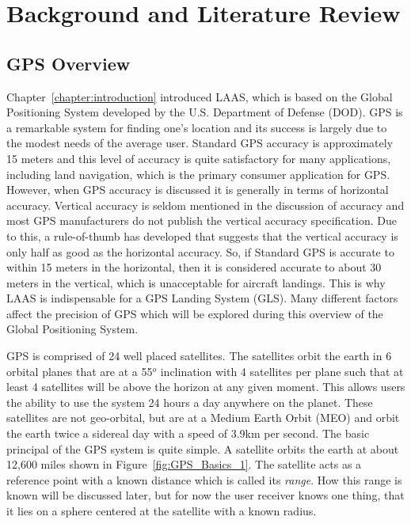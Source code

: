 \chapter{Background and Literature Review}
\label{ch:background}
\section{GPS Overview}

Chapter~\ref{chapter:introduction} introduced LAAS, which is based on the Global Positioning System developed by the U.S. Department of Defense (DOD).  GPS is a remarkable system for finding one's location and its success is largely due to the modest needs of the average user. Standard GPS accuracy is approximately 15 meters\citep[]{GPS_FOR_DUMMIES} and this level of accuracy is quite satisfactory for many applications, including land navigation, which is the primary consumer application for GPS. However, when GPS accuracy is discussed it is generally in terms of horizontal accuracy.  Vertical accuracy is seldom mentioned in the discussion of accuracy and most GPS manufacturers do not publish the vertical accuracy specification.  Due to this, a rule-of-thumb has developed that suggests that the vertical accuracy is only half as good as the horizontal accuracy.  So, if Standard GPS is accurate to within 15 meters in the horizontal, then it is considered accurate to about 30 meters in the vertical, which is unacceptable for aircraft landings. This is why LAAS is indispensable for a GPS Landing System (GLS).  Many different factors affect the precision of GPS which will be explored during this overview of the Global Positioning System.

GPS is comprised of 24 well placed satellites. The satellites orbit the earth in 6 orbital planes that are at a 55$^o$ inclination with 4 satellites per plane such that at least 4 satellites will be above the horizon at any given moment. This allows users the ability to use the system 24 hours a day anywhere on the planet. These satellites are not geo-orbital, but are at a Medium Earth Orbit (MEO) and orbit the earth twice a sidereal day with a speed of 3.9km per second.  The basic principal of the GPS system is quite simple.  A satellite orbits the earth at about 12,600 miles shown in Figure~\ref{fig:GPS_Basics_1}. The satellite acts as a reference point with a known distance which is called its \textit{range}.  How this range is known will be discussed later, but for now the user receiver knows one thing, that it lies on a sphere centered at the satellite with a known radius.

